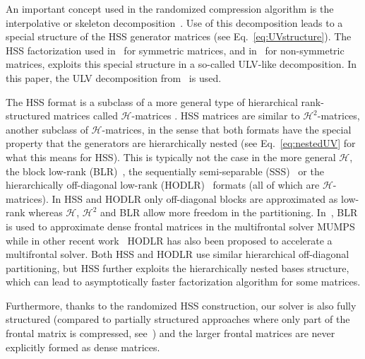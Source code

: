 \documentclass{article}
\newcommand{\ignore}[1]{}
\begin{document}
An important concept used in the randomized compression algorithm is
the interpolative or skeleton
decomposition~\cite{cheng2005compression}. Use of this decomposition
leads to a special structure of the HSS generator matrices (see
Eq.~\eqref{eq:UVstructure}). The HSS factorization used
in~\cite{xia2013randomized} for symmetric matrices, and
in~\cite{xia2012superfast} for non-symmetric matrices, exploits this
special structure in a so-called ULV-like decomposition. In this
paper, the ULV decomposition from~\cite{xia2012superfast} is used.

The HSS format is a subclass of a more general type of hierarchical
rank-structured matrices called $\mathcal{H}$-matrices
\cite{borm2003introduction}. HSS matrices are similar to
$\mathcal{H}^2$-matrices, another subclass of $\mathcal{H}$-matrices,
in the sense that both formats have the special property that the
generators are hierarchically nested (see Eq.~\eqref{eq:nestedUV} for
what this means for HSS). This is typically not the case in the more
general $\mathcal{H}$, the block low-rank
(BLR)~\cite{amestoy2014improving}, the sequentially semi-separable
(SSS)~\cite{vandebril2005bibliography} or the hierarchically
off-diagonal low-rank (HODLR)~\cite{SivaramPHD} formats (all of which
are $\mathcal{H}$-matrices). In HSS and HODLR only off-diagonal blocks
are approximated as low-rank whereas $\mathcal{H}$, $\mathcal{H}^2$
and BLR allow more freedom in the
partitioning. In~\cite{amestoy2014improving}, BLR is used to
approximate dense frontal matrices in the multifrontal solver
MUMPS~\cite{amestoy2001fully} while in other recent
work~\cite{AminfarAD14} HODLR has also been proposed to accelerate a
multifrontal solver.  Both HSS and HODLR use similar hierarchical
off-diagonal partitioning, but HSS further exploits the hierarchically
nested bases structure, which can lead to asymptotically faster
factorization algorithm for some matrices.
\ignore{
\todo[inline]{[FH] The above sentence is true for some matrices and false
for some others. I think it is very dangerous to state things
like that or to try to justify why we do HSS and not something else.
So far no one has done any comparison besides a couple experiments
with BLR vs. HSS for 3D Helmholtz.}
}

Furthermore, thanks to the randomized HSS construction, our solver is
also fully structured (compared to partially structured approaches
where only part of the frontal matrix is compressed,
see~\cite{wang20113d}) and the larger frontal matrices are never
explicitly formed as dense matrices.
\end{document}

